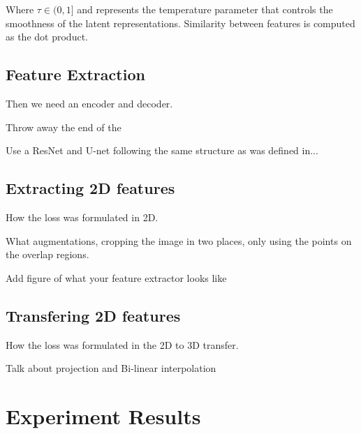 \documentclass[10pt,twocolumn,letterpaper]{article}
\begin{document}
Where $\tau \in (0,1]$ and represents the temperature parameter that controls the smoothness of the latent representations. Similarity between features is computed as the dot product.

\subsection{Feature Extraction}
\label{sec:method:featuresExtractors}

Then we need an encoder and decoder.

Throw away the end of the

Use a ResNet and U-net following the same structure as was defined in...


\subsection{Extracting 2D features}
\label{sec:method:features2d}

How the loss was formulated in 2D.

What augmentations, cropping the image in two places, only using the points on the overlap regions.

Add figure of what your feature extractor looks like

\subsection{Transfering 2D features}
\label{sec:method:features2D3D}

How the loss was formulated in the 2D to 3D transfer.

Talk about projection and Bi-linear interpolation

\section{Experiment Results}
\label{sec:results}
\end{document}
